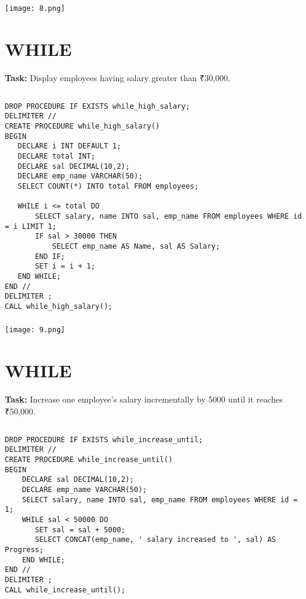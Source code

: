 \documentclass[12pt,a4paper]{article}
\begin{document}
\subsubsection{}
\begin{center}
    \texttt{[image: 8.png]}
\end{center}


\section{WHILE}
\textbf{Task:} Display employees having salary greater than ₹30,000.

\subsection{}
\begin{lstlisting}
DROP PROCEDURE IF EXISTS while_high_salary;
DELIMITER //
CREATE PROCEDURE while_high_salary()
BEGIN
   DECLARE i INT DEFAULT 1;
   DECLARE total INT;
   DECLARE sal DECIMAL(10,2);
   DECLARE emp_name VARCHAR(50);
   SELECT COUNT(*) INTO total FROM employees;

   WHILE i <= total DO
       SELECT salary, name INTO sal, emp_name FROM employees WHERE id = i LIMIT 1;
       IF sal > 30000 THEN
           SELECT emp_name AS Name, sal AS Salary;
       END IF;
       SET i = i + 1;
   END WHILE;
END //
DELIMITER ;
CALL while_high_salary();

\end{lstlisting}

\subsubsection{}
\begin{center}
    \texttt{[image: 9.png]}
\end{center}


\section{WHILE}
\textbf{Task:} Increase one employee’s salary incrementally by 5000 until it reaches ₹50,000.

\subsection{}
\begin{lstlisting}
DROP PROCEDURE IF EXISTS while_increase_until;
DELIMITER //
CREATE PROCEDURE while_increase_until()
BEGIN
	DECLARE sal DECIMAL(10,2);
	DECLARE emp_name VARCHAR(50);
	SELECT salary, name INTO sal, emp_name FROM employees WHERE id = 1;
	WHILE sal < 50000 DO
	   SET sal = sal + 5000;
	   SELECT CONCAT(emp_name, ' salary increased to ', sal) AS Progress;
	END WHILE;
END //
DELIMITER ;
CALL while_increase_until();

\end{lstlisting}
\end{document}
